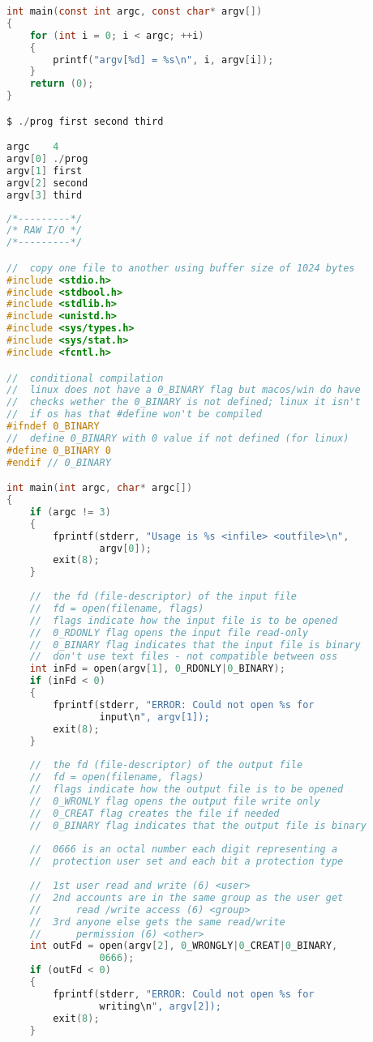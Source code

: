 \documentclass[8pt]{extarticle}
\begin{document}
\begin{small}
\begin{multicols}{2}
\begin{lstlisting}[language=C]
int main(const int argc, const char* argv[])
{
	for (int i = 0; i < argc; ++i)
	{
		printf("argv[%d] = %s\n", i, argv[i]);
	}
	return (0);
}

$ ./prog first second third

argc	4
argv[0]	./prog
argv[1]	first
argv[2]	second
argv[3]	third
\end{lstlisting}

\begin{lstlisting}[language=C]
/*---------*/
/* RAW I/O */
/*---------*/

//  copy one file to another using buffer size of 1024 bytes
#include <stdio.h>
#include <stdbool.h>
#include <stdlib.h>
#include <unistd.h>
#include <sys/types.h>
#include <sys/stat.h>
#include <fcntl.h>

//  conditional compilation
//  linux does not have a 0_BINARY flag but macos/win do have
//  checks wether the 0_BINARY is not defined; linux it isn't
//  if os has that #define won't be compiled
#ifndef 0_BINARY
//  define 0_BINARY with 0 value if not defined (for linux)
#define 0_BINARY 0
#endif // 0_BINARY

int main(int argc, char* argc[])
{
	if (argc != 3) 
	{
		fprintf(stderr, "Usage is %s <infile> <outfile>\n", 
				argv[0]);
		exit(8);
	}
	
	//  the fd (file-descriptor) of the input file
	//  fd = open(filename, flags)
	//  flags indicate how the input file is to be opened
	//  0_RDONLY flag opens the input file read-only
	//  0_BINARY flag indicates that the input file is binary
	//  don't use text files - not compatible between oss
	int inFd = open(argv[1], 0_RDONLY|0_BINARY);
	if (inFd < 0)
	{
		fprintf(stderr, "ERROR: Could not open %s for 
				input\n", argv[1]);
		exit(8);
	}
	
	//  the fd (file-descriptor) of the output file
	//  fd = open(filename, flags)
	//  flags indicate how the output file is to be opened
	//  0_WRONLY flag opens the output file write only
	//  0_CREAT flag creates the file if needed
	//  0_BINARY flag indicates that the output file is binary
	
	//  0666 is an octal number each digit representing a 
	//  protection user set and each bit a protection type
	
	//  1st user read and write (6) <user>
	//  2nd accounts are in the same group as the user get 
	//      read /write access (6) <group>
	//  3rd anyone else gets the same read/write 
	//      permission (6) <other>
	int outFd = open(argv[2], 0_WRONGLY|0_CREAT|0_BINARY, 
				0666);
	if (outFd < 0)
	{
		fprintf(stderr, "ERROR: Could not open %s for 
				writing\n", argv[2]);
		exit(8);
	}
	

\end{lstlisting}
\end{multicols}
\end{small}
\end{document}
